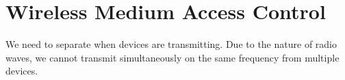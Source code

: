 \section{Wireless Medium Access Control}\label{sec:Wireless_MAC}
We need to separate when devices are transmitting.
Due to the nature of radio waves, we cannot transmit simultaneously on the same frequency from multiple devices.








